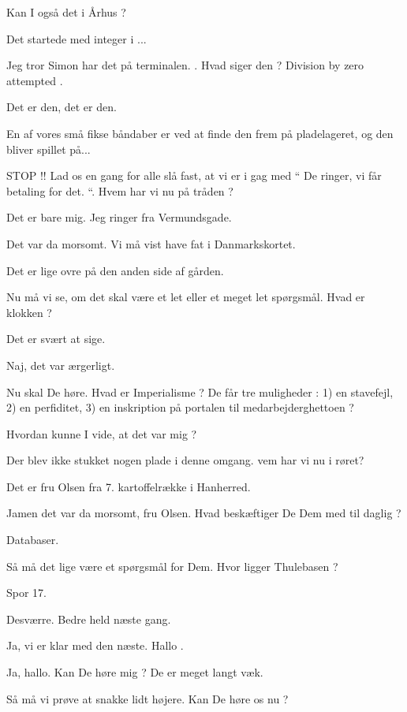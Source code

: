 \documentclass[a4paper,11pt]{article}
\begin{document}
\begin{sketch}
 Kan I også det i Århus ?

 Det startede med integer i ...

 Jeg tror Simon har det på terminalen. . Hvad siger
den ? Division by zero attempted .

 Det er den, det er den.

 En af vores små fikse båndaber er ved at finde den frem på
pladelageret, og den bliver spillet på...

 STOP !! Lad os en gang for alle slå fast, at vi er i gag med ``
De ringer, vi får betaling for det. ``. Hvem har vi nu på tråden ?

 Det er bare mig. Jeg ringer fra Vermundsgade.

 Det var da morsomt. Vi må vist have fat i Danmarkskortet.

 Det er lige ovre på den anden side af gården.

 Nu må vi se, om det skal være et let eller et meget let
spørgsmål. Hvad er klokken ?

 Det er svært at sige.

 Naj, det var ærgerligt.

 Nu skal De høre. Hvad er Imperialisme ? De får tre muligheder :
1) en stavefejl, 2) en perfiditet, 3) en inskription på portalen til
medarbejderghettoen ?

 Hvordan kunne I vide, at det var mig ?

 Der blev ikke stukket nogen plade i denne omgang. vem har vi nu i
røret?

 Det er fru Olsen fra 7. kartoffelrække i Hanherred.

 Jamen det var da morsomt, fru Olsen. Hvad beskæftiger De Dem med
til daglig ?

 Databaser.

 Så må det lige være et spørgsmål for Dem. Hvor ligger Thulebasen
?

 Spor 17.

 Desværre. Bedre held næste gang.

 Ja, vi er klar med den næste. Hallo .

 Ja, hallo. Kan De høre mig ? De er meget langt væk.

 Så må vi prøve at snakke lidt højere. Kan De høre os nu ?


\end{sketch}
\end{document}
